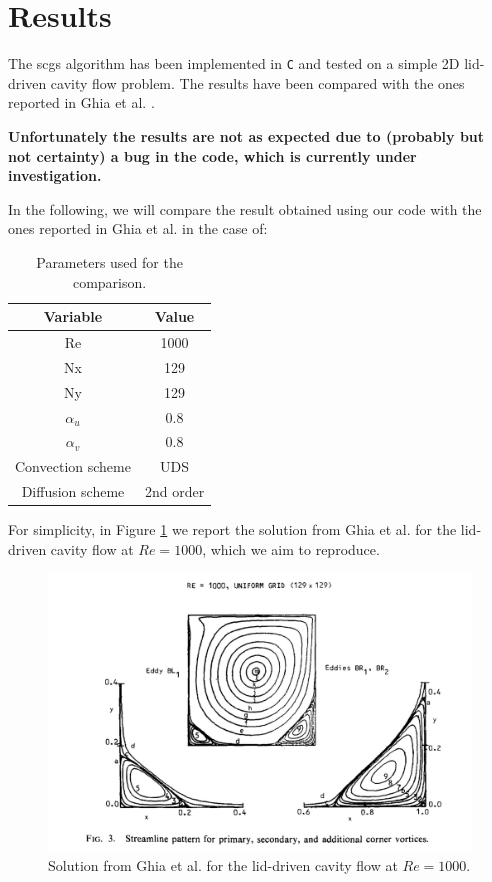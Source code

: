 \section{Results}
\label{sec:results}

The \acrshort{scgs} algorithm has been implemented in \texttt{C} and tested on a simple 2D lid-driven cavity flow problem.
The results have been compared with the ones reported in Ghia et al. \cite{Ghia1982HighReSF}.

\textbf{Unfortunately the results are not as expected due to (probably but not certainty) a bug in the code, which is currently under investigation.}

In the following, we will compare the result obtained using our code with the ones reported in Ghia et al. \cite{Ghia1982HighReSF} in the case of:

\begin{table}[H]
    \centering
    \begin{tabular}{|c|c|}
        \hline
        \textbf{Variable} & \textbf{Value} \\ \hline
        Re                & 1000           \\
        Nx                & 129            \\
        Ny                & 129            \\
        $\alpha_u$        & 0.8            \\
        $\alpha_v$        & 0.8            \\
        Convection scheme & UDS            \\
        Diffusion scheme  & 2nd order      \\\hline
    \end{tabular}
    \caption{Parameters used for the comparison.}
    \label{tab:parameters_for_comparison}
\end{table}

For simplicity, in Figure \ref{fig:ghia_solution_Re1000} we report the solution from Ghia et al. \cite{Ghia1982HighReSF} for the lid-driven cavity flow at $Re = 1000$, which we aim to reproduce.

\begin{figure}[H]
    \centering
    \includegraphics[width=.9\textwidth]{./img/ghia_solution_Re1000}
    \caption{Solution from Ghia et al. \cite{Ghia1982HighReSF} for the lid-driven cavity flow at $Re = 1000$.}
    \label{fig:ghia_solution_Re1000}
\end{figure}

